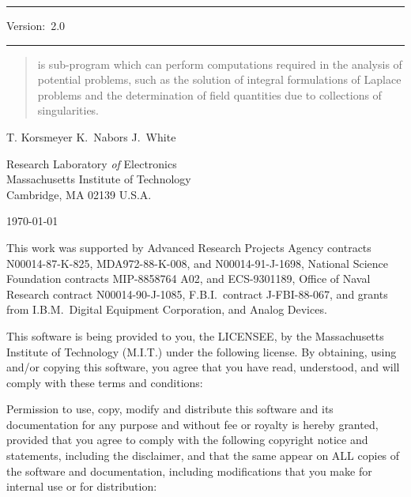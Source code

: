 
\begin{titlepage}
\vskip 36pt
\begin{center}

\hrule
\vspace{ .2 in}
{\Huge {\bf \fas} Version:\ 2.0}
\vspace{ .14 in}
\hrule

\vskip 24pt
\begin{quote}
\fas is sub-program which can perform computations required in 
the analysis of potential problems, such as the solution of 
integral formulations of Laplace problems and the determination
of field quantities due to collections of singularities.
\end{quote}

\vskip 120pt
\hspace*{1.4in} 
T. Korsmeyer \hfill K.\ Nabors \hfill  J.\ White \hspace*{1.4in}
\vskip 24pt

Research Laboratory {\em of}  Electronics \\
\vskip 12pt
Massachusetts Institute of Technology \\
Cambridge, MA  02139 U.S.A.

\vskip 36pt

\today


\end{center}

\vfill
\noindent This work was supported by Advanced Research Projects
Agency contracts N00014-87-K-825, MDA972-88-K-008, and  N00014-91-J-1698,
National Science Foundation contracts MIP-8858764 A02, and ECS-9301189,
Office of Naval Research contract N00014-90-J-1085,
F.B.I.\ contract J-FBI-88-067, and grants from I.B.M.\,
Digital Equipment Corporation, and Analog Devices.
\end{titlepage}

\mbox{}
\vfill

\noindent 
This software is being provided to you, the LICENSEE, by the Massachusetts
Institute of Technology (M.I.T.) under the following license.  By
obtaining, using and/or copying this software, you agree that you have
read, understood, and will comply with these terms and conditions:  

Permission to use, copy, modify and distribute this software and its
documentation for any purpose and without fee or royalty is hereby granted,
provided that you agree to comply with the following copyright notice and
statements, including the disclaimer, and that the same appear on ALL
copies of the software and documentation, including modifications that you
make for internal use or for distribution:

